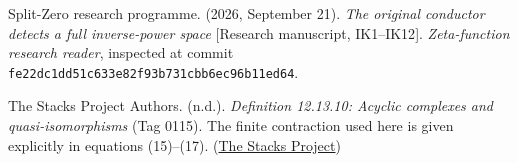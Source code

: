 \documentclass[11pt]{article}
\begin{document}
Split-Zero research programme. (2026, September 21). \emph{The original conductor detects a full inverse-power space} {[}Research manuscript, IK1--IK12{]}. \emph{Zeta-function research reader}, inspected at commit \nolinkurl{fe22dc1dd51c633e82f93b731cbb6ec96b11ed64}.

The Stacks Project Authors. (n.d.). \emph{Definition 12.13.10: Acyclic complexes and quasi-isomorphisms} (Tag 0115). The finite contraction used here is given explicitly in equations (15)--(17). (\href{https://stacks.math.columbia.edu/tag/0115}{The Stacks Project})
\end{document}
